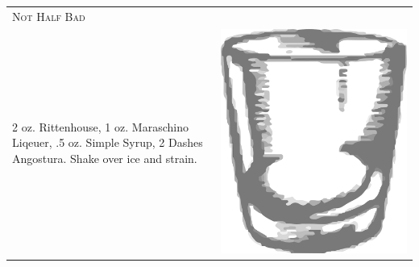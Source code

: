 \documentclass{article}
\begin{document}
\begin{tabular}{p{2in} p{0.5in}}
  \multicolumn{2}{p{3in}}{\centering\Huge\textsc{Not Half Bad}} \\ 
  
   \vspace{-0.1in}2 oz. Rittenhouse, 1 oz. Maraschino Liqeuer, .5 oz. Simple
    Syrup, 2 Dashes Angostura. Shake over ice and strain. &
   \vspace{-0.1in} \includegraphics{rocks_glass.png}
\end{tabular}
\end{document}
